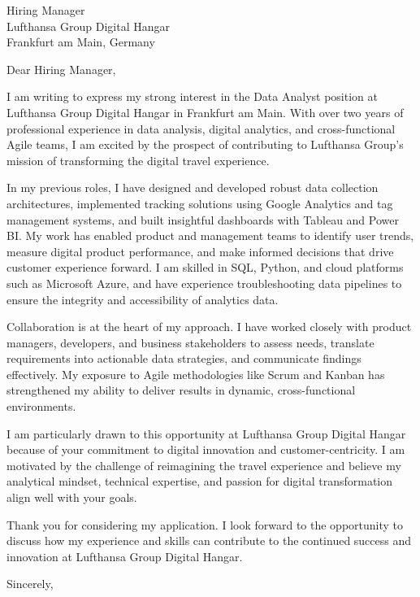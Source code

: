 \documentclass{letter}
\begin{document}
\begin{letter}{Hiring Manager \\ Lufthansa Group Digital Hangar \\ Frankfurt am Main, Germany}

\opening{Dear Hiring Manager,}

I am writing to express my strong interest in the Data Analyst position at Lufthansa Group Digital Hangar in Frankfurt am Main. With over two years of professional experience in data analysis, digital analytics, and cross-functional Agile teams, I am excited by the prospect of contributing to Lufthansa Group’s mission of transforming the digital travel experience.

In my previous roles, I have designed and developed robust data collection architectures, implemented tracking solutions using Google Analytics and tag management systems, and built insightful dashboards with Tableau and Power BI. My work has enabled product and management teams to identify user trends, measure digital product performance, and make informed decisions that drive customer experience forward. I am skilled in SQL, Python, and cloud platforms such as Microsoft Azure, and have experience troubleshooting data pipelines to ensure the integrity and accessibility of analytics data.

Collaboration is at the heart of my approach. I have worked closely with product managers, developers, and business stakeholders to assess needs, translate requirements into actionable data strategies, and communicate findings effectively. My exposure to Agile methodologies like Scrum and Kanban has strengthened my ability to deliver results in dynamic, cross-functional environments.

I am particularly drawn to this opportunity at Lufthansa Group Digital Hangar because of your commitment to digital innovation and customer-centricity. I am motivated by the challenge of reimagining the travel experience and believe my analytical mindset, technical expertise, and passion for digital transformation align well with your goals.

Thank you for considering my application. I look forward to the opportunity to discuss how my experience and skills can contribute to the continued success and innovation at Lufthansa Group Digital Hangar.

\closing{Sincerely,}

\end{letter}
\end{document}
